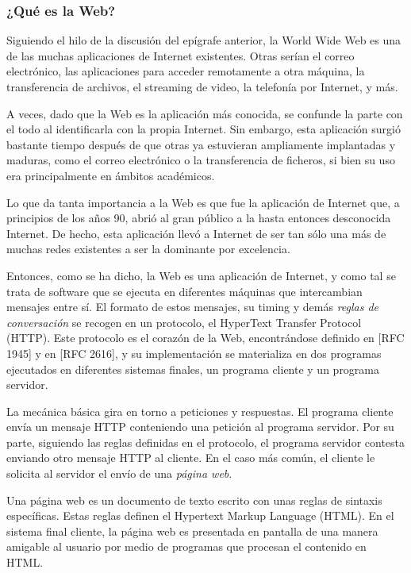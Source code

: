 \documentclass[a4paper]{article}
\begin{document}
    \subsubsection{¿Qué es la Web?}
    Siguiendo el hilo de la discusión del epígrafe anterior, la World Wide Web es una de las muchas aplicaciones de Internet existentes. Otras serían el correo electrónico, las aplicaciones para acceder remotamente a otra máquina, la transferencia de archivos, el streaming de video, la telefonía por Internet, y más.
    
    A veces, dado que la Web es la aplicación más conocida, se confunde la parte con el todo al identificarla con la propia Internet. Sin embargo, esta aplicación surgió bastante tiempo después de que otras ya estuvieran ampliamente implantadas y maduras, como el correo electrónico o la transferencia de ficheros, si bien su uso era principalmente en ámbitos académicos.
    
    Lo que da tanta importancia a la Web es que fue la aplicación de Internet que, a principios de los años 90, abrió al gran público a la hasta entonces desconocida Internet. De hecho, esta aplicación llevó a Internet de ser tan sólo una más de muchas redes existentes a ser la dominante por excelencia.
   
   	Entonces, como se ha dicho, la Web es una aplicación de Internet, y como tal se trata de software que se ejecuta en diferentes máquinas que intercambian mensajes entre sí. El formato de estos mensajes, su timing y demás \emph{reglas de conversación} se recogen en un protocolo, el HyperText Transfer Protocol (HTTP). Este protocolo es el corazón de la Web, encontrándose definido en [RFC 1945] y en [RFC 2616], y su implementación se materializa en dos programas ejecutados en diferentes sistemas finales, un programa cliente y un programa servidor.
    
    La mecánica básica gira en torno a peticiones y respuestas. El programa cliente envía un mensaje HTTP conteniendo una petición al programa servidor. Por su parte, siguiendo las reglas definidas en el protocolo, el programa servidor contesta enviando otro mensaje HTTP al cliente. En el caso más común, el cliente le solicita al servidor el envío de una \emph{página web}.
    
    Una página web es un documento de texto escrito con unas reglas de sintaxis específicas. Estas reglas definen el Hypertext Markup Language (HTML). En el sistema final cliente, la página web es presentada en pantalla de una manera amigable al usuario por medio de programas que procesan el contenido en HTML.
    
\end{document}
